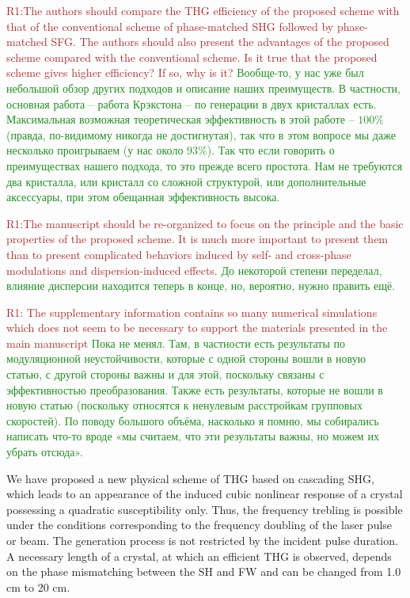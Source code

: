 \documentclass[a4paper, 12pt, onecolumn]{extarticle}
\begin{document}
\textcolor{brown}{R1:The authors should compare the THG efficiency of the proposed scheme with that of the conventional scheme of phase-matched SHG followed by phase-matched SFG. The authors should also present the advantages of the proposed scheme compared with the conventional scheme. Is it true that the proposed scheme gives higher efficiency? If so, why is it?} \textcolor{ForestGreen}{Вообще-то, у нас уже был небольшой обзор других подходов и описание наших преимуществ. В частности, основная работа – работа Крэкстона – по генерации в двух кристаллах есть. Максимальная возможная теоретическая эффективность в этой работе – $100\%$ (правда, по-видимому никогда не достигнутая), так что в этом вопросе мы даже несколько проигрываем (у нас около $93\%$). Так что если говорить о преимуществах нашего подхода, то это прежде всего простота. Нам не требуются два кристалла, или кристалл со сложной структурой, или дополнительные аксессуары, при этом обещанная эффективность высока.}




\textcolor{brown}{R1:The manuscript should be re-organized to focus on the principle and the basic properties of the proposed scheme. It is much more important to present them than to present complicated behaviors induced by self- and cross-phase modulations and dispersion-induced effects.}
\textcolor{ForestGreen}{До некоторой степени переделал, влияние дисперсии находится теперь в конце, но, вероятно, нужно править ещё.}


\textcolor{brown}{R1: The supplementary information contains so many numerical simulations which does not seem to be necessary to support the materials presented in the main manuscript} \textcolor{ForestGreen}{Пока не менял. Там, в частности есть результаты по модуляционной неустойчивости, которые с одной стороны вошли в новую статью, с другой стороны важны и для этой, поскольку связаны с эффективностью преобразования. Также есть результаты, которые не вошли в новую статью (поскольку относятся к ненулевым расстройкам групповых скоростей).
По поводу большого объёма, насколько я помню, мы собирались написать что-то вроде «мы считаем, что эти результаты важны, но можем их убрать отсюда».
}

We have proposed a new physical scheme of THG based on cascading SHG, which leads to an appearance of the induced cubic nonlinear response of a crystal possessing a quadratic susceptibility only. Thus, the frequency trebling is possible under the conditions corresponding to the frequency doubling of the laser pulse or beam. The generation process is not restricted by the incident pulse duration. A necessary length of a crystal, at which an efficient THG is observed, depends on the phase mismatching between the SH and FW and can be changed from 1.0 cm to 20 cm. 
\end{document}
